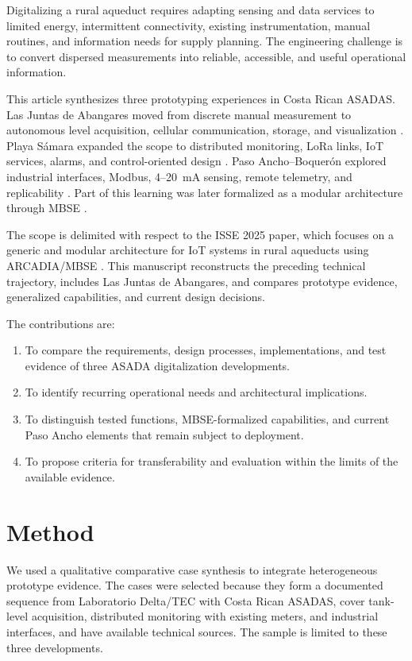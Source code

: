 \documentclass[conference]{IEEEtran}
\begin{document}
Digitalizing a rural aqueduct requires adapting sensing and data services to limited energy, intermittent connectivity, existing instrumentation, manual routines, and information needs for supply planning. The engineering challenge is to convert dispersed measurements into reliable, accessible, and useful operational information.

This article synthesizes three prototyping experiences in Costa Rican ASADAS. Las Juntas de Abangares moved from discrete manual measurement to autonomous level acquisition, cellular communication, storage, and visualization \cite{chavarria2021implementacion}. Playa S\'{a}mara expanded the scope to distributed monitoring, LoRa links, IoT services, alarms, and control-oriented design \cite{solorzano2021sistema}. Paso Ancho--Boquer\'{o}n explored industrial interfaces, Modbus, 4--20~mA sensing, remote telemetry, and replicability \cite{oviedo2024desarrollo}. Part of this learning was later formalized as a modular architecture through MBSE \cite{arguedas2025towards}.

The scope is delimited with respect to the ISSE 2025 paper, which focuses on a generic and modular architecture for IoT systems in rural aqueducts using ARCADIA/MBSE \cite{arguedas2025towards}. This manuscript reconstructs the preceding technical trajectory, includes Las Juntas de Abangares, and compares prototype evidence, generalized capabilities, and current design decisions.

The contributions are:
\begin{enumerate}
\item To compare the requirements, design processes, implementations, and test evidence of three ASADA digitalization developments.
\item To identify recurring operational needs and architectural implications.
\item To distinguish tested functions, MBSE-formalized capabilities, and current Paso Ancho elements that remain subject to deployment.
\item To propose criteria for transferability and evaluation within the limits of the available evidence.
\end{enumerate}

\section{Method}

We used a qualitative comparative case synthesis to integrate heterogeneous prototype evidence. The cases were selected because they form a documented sequence from Laboratorio Delta/TEC with Costa Rican ASADAS, cover tank-level acquisition, distributed monitoring with existing meters, and industrial interfaces, and have available technical sources. The sample is limited to these three developments.
\end{document}
